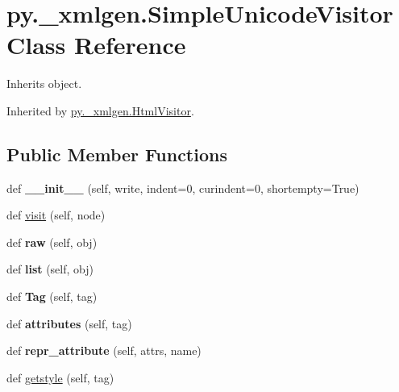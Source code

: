 \hypertarget{classpy_1_1__xmlgen_1_1_simple_unicode_visitor}{}\section{py.\+\_\+xmlgen.\+Simple\+Unicode\+Visitor Class Reference}
\label{classpy_1_1__xmlgen_1_1_simple_unicode_visitor}


Inherits object.



Inherited by \hyperlink{classpy_1_1__xmlgen_1_1_html_visitor}{py.\+\_\+xmlgen.\+Html\+Visitor}.

\subsection*{Public Member Functions}
\begin{DoxyCompactItemize}
\item 
\mbox{\label{classpy_1_1__xmlgen_1_1_simple_unicode_visitor_a200cb61338125178b79e64037842ccbf}} 
def {\bfseries \+\_\+\+\_\+init\+\_\+\+\_\+} (self, write, indent=0, curindent=0, shortempty=True)
\item 
def \hyperlink{classpy_1_1__xmlgen_1_1_simple_unicode_visitor_af46e97d5b1f5bf6ac778786734eeca67}{visit} (self, node)
\item 
\mbox{\label{classpy_1_1__xmlgen_1_1_simple_unicode_visitor_af4c87078b5b4f493c2c2957c5e71e359}} 
def {\bfseries raw} (self, obj)
\item 
\mbox{\label{classpy_1_1__xmlgen_1_1_simple_unicode_visitor_aaac641f2f15317d27cb49f9a9825108f}} 
def {\bfseries list} (self, obj)
\item 
\mbox{\label{classpy_1_1__xmlgen_1_1_simple_unicode_visitor_a693deda40220267de8de60cdeabb28b7}} 
def {\bfseries Tag} (self, tag)
\item 
\mbox{\label{classpy_1_1__xmlgen_1_1_simple_unicode_visitor_a6c92ba80efc1f24521686ef6e42a7db9}} 
def {\bfseries attributes} (self, tag)
\item 
\mbox{\label{classpy_1_1__xmlgen_1_1_simple_unicode_visitor_a1393716f860373eb44992a652ff410c8}} 
def {\bfseries repr\+\_\+attribute} (self, attrs, name)
\item 
def \hyperlink{classpy_1_1__xmlgen_1_1_simple_unicode_visitor_a89d4b53fcfc7e80fcbab8dd6439b43fb}{getstyle} (self, tag)
\end{DoxyCompactItemize}
